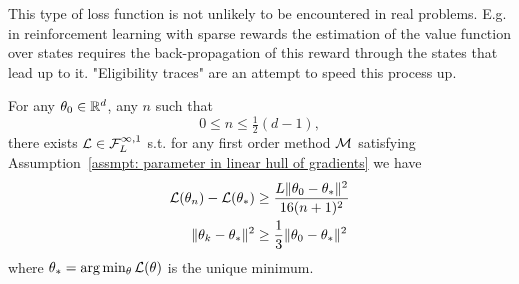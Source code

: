 \begin{remark}
	This type of loss function is not unlikely to be encountered in real
	problems. E.g. in reinforcement learning with sparse rewards the estimation
	of the value function over states requires the back-propagation of this
	reward through the states that lead up to it. "Eligibility traces"
	\parencite[Chapter 12]{suttonReinforcementLearningIntroduction2018}
	are an attempt to speed this process up.
\end{remark}
\begin{theorem}\label{thm: convex function complexity bound}
	For any \(\weights_0\in\reals^d\), any \(n\) such that 
	\[0\le n\le \tfrac12 (d-1),\]
	there exists \(\Loss\in\lipGradientSet[\infty,1]{\ubound}\)
	s.t. for any first order method \(\firstOrderMethod\)
	satisfying Assumption~\ref{assmpt: parameter in linear hull of gradients}
	we have
	\begin{subequations}
	\begin{align}
		\Loss(\weights_n) - \Loss(\minimum)
		&\ge \frac{\ubound \|\weights_0 - \minimum\|^2}{16(n+1)^2} \\
		\|\weights_k -\minimum\|^2 
		&\ge \frac13 \|\weights_0 - \minimum\|^2
	\end{align}
	\end{subequations}
	where \(\minimum = \arg\min_\weights \Loss(\weights)\) is the unique minimum.
\end{theorem}
